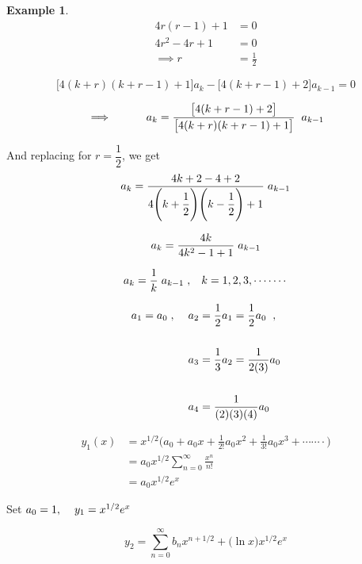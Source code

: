 \documentclass[11pt,a4paper]{article}
\theoremstyle{definition}
\newtheorem{exa}[thm]{Example}
\begin{document}
\begin{exa}
\begin{align*}
4r(r-1) + 1 & = 0\\
4r^2 - 4r + 1 & = 0\\
\implies r & = \frac{1}{2}
\end{align*}

$$\big[4(k+r)(k+r-1) + 1\big] a_k - \big[4(k + r -1) + 2\big]a_{k-1} = 0$$

$$\implies\hspace{1cm} a_k   = \frac{\big[4(k + r -1) + 2\big]}{\big[4(k+r)(k+r-1) + 1\big]}\hspace{0.2cm}a_{k-1}$$

And replacing for $r= \dfrac{1}{2}$, we get
$$a_k = \frac{4k + 2 - 4 + 2}{4 \Bigg(k+ \dfrac{1}{2}\Bigg)\Bigg( k - \dfrac{1}{2}\Bigg) + 1}\hspace{0.1cm} a_{k-1}$$


$$a_k = \frac{4k}{4k^2 -1 + 1}\hspace{0.1cm} a_{k-1}$$

$$a_k = \frac{1}{k}\hspace{0.1cm}a_{k-1}\hspace{0.1cm},\hspace{0.3cm} k = 1,2,3,\cdot\cdots\cdots$$

\begin{align*}
a_1 = a_0\hspace{0.1cm}, \hspace{0.4cm} a_2 & = \frac{1}{2}a_1 = \frac{1}{2}a_0\hspace{0.2cm},\\\\
a_3 & = \frac{1}{3}a_2 = \frac{1}{2(3)}a_0\\\\
a_4 & = \frac{1}{(2)(3)(4)}a_0
\end{align*}

\begin{align*}
y_1(x) & = x^{1/2} \bigg(a_0 + a_0x + \frac{1}{2!}a_0x^2 + \frac{1}{3!}a_0 x^3 + \cdots\cdots\cdot\bigg)\\
& = a_0x^{1/2}\sum^{\infty}_{n =0} \frac{x^n}{n!}\\
& = a_0 x^{1/2}e^x
\end{align*}

Set $a_0 = 1,\hspace{0.4cm} y_1 = x^{1/2}e^x$

$$y_2 = \sum^{\infty}_{n=0} b_n x^{n+ 1/2} + \big(\ln x\big) x^{1/2} e^x$$


\pagebreak
\end{exa}
\end{document}
